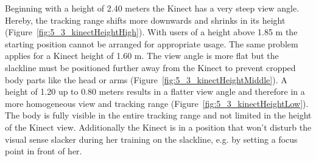 Beginning with a height of 2.40 meters the Kinect has a very steep view angle.
Hereby, the tracking range shifts more downwards and shrinks in its height (Figure~\ref{fig:5_3_kinectHeightHigh}).
With users of a height above 1.85 m the starting position cannot be arranged for appropriate usage.
The same problem applies for a Kinect height of 1.60 m. The view angle is more flat but the slackline must be positioned further away from the Kinect to prevent cropped body parts like the head or arms (Figure~\ref{fig:5_3_kinectHeightMiddle}).
A height of 1.20 up to 0.80 meters results in a flatter view angle and therefore in a more homogeneous view and tracking range (Figure~\ref{fig:5_3_kinectHeightLow}).
The body is fully visible in the entire tracking range and not limited in the height of the Kinect view.
Additionally the Kinect is in a position that won't disturb the visual sense slacker during her training on the slackline, e.g. by setting a focus point in front of her.

